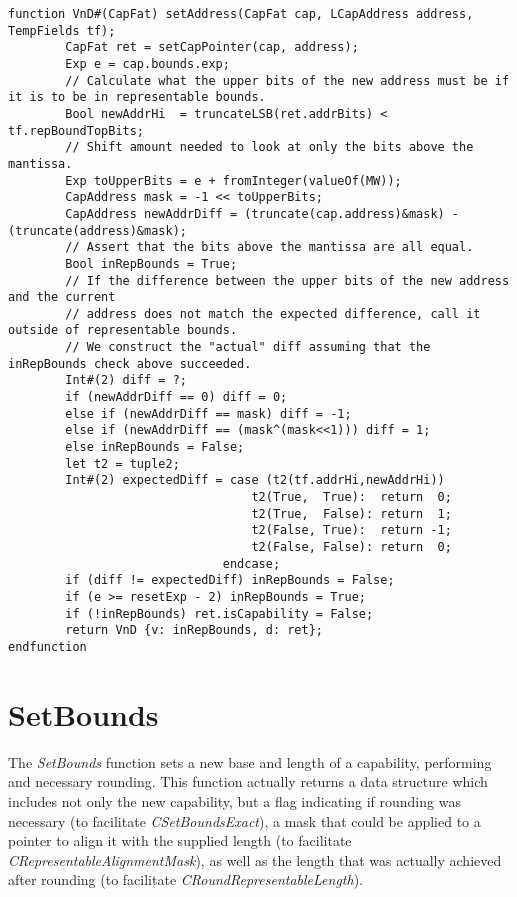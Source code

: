 \begin{lstlisting}[language=bluespec]
function VnD#(CapFat) setAddress(CapFat cap, LCapAddress address, TempFields tf);
        CapFat ret = setCapPointer(cap, address);
        Exp e = cap.bounds.exp;
        // Calculate what the upper bits of the new address must be if it is to be in representable bounds.
        Bool newAddrHi  = truncateLSB(ret.addrBits) < tf.repBoundTopBits;
        // Shift amount needed to look at only the bits above the mantissa.
        Exp toUpperBits = e + fromInteger(valueOf(MW));
        CapAddress mask = -1 << toUpperBits;
        CapAddress newAddrDiff = (truncate(cap.address)&mask) - (truncate(address)&mask);
        // Assert that the bits above the mantissa are all equal.
        Bool inRepBounds = True;
        // If the difference between the upper bits of the new address and the current
        // address does not match the expected difference, call it outside of representable bounds.
        // We construct the "actual" diff assuming that the inRepBounds check above succeeded.
        Int#(2) diff = ?;
        if (newAddrDiff == 0) diff = 0;
        else if (newAddrDiff == mask) diff = -1;
        else if (newAddrDiff == (mask^(mask<<1))) diff = 1;
        else inRepBounds = False;
        let t2 = tuple2;
        Int#(2) expectedDiff = case (t2(tf.addrHi,newAddrHi))
                                  t2(True,  True):  return  0;
                                  t2(True,  False): return  1;
                                  t2(False, True):  return -1;
                                  t2(False, False): return  0;
                              endcase;
        if (diff != expectedDiff) inRepBounds = False;
        if (e >= resetExp - 2) inRepBounds = True;
        if (!inRepBounds) ret.isCapability = False;
        return VnD {v: inRepBounds, d: ret};
endfunction
\end{lstlisting}

\section{SetBounds}
\label{sec:cheri-128-listings-setbounds}

The \emph{SetBounds} function sets a new base and length of a capability, performing
and necessary rounding.
This function actually returns a data structure which includes not only the new capability,
but a flag indicating if rounding was necessary (to facilitate \emph{CSetBoundsExact}),
a mask that could be applied to a pointer to align it with the supplied length (to facilitate \emph{CRepresentableAlignmentMask}),
as well as the length that was actually achieved after rounding (to facilitate \emph{CRoundRepresentableLength}).


